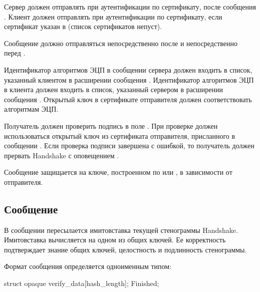 Сервер должен отправлять  при аутентификации по 
сертификату, после сообщения .
%
Клиент должен отправлять  при аутентификации по 
сертификату, если сертификат указан в  (список 
сертификатов непуст).

Сообщение  должно отправляться непосредственно после 
 и непосредственно перед .

Идентификатор алгоритмов ЭЦП в сообщении  сервера 
должен входить в список, указанный клиентом в расширении 
 сообщения . 
%
%
Идентификатор алгоритмов ЭЦП в  клиента 
должен входить в список, указанный сервером в расширении 
 сообщения 
.  
%
Открытый ключ в сертификате отправителя  должен 
соответствовать алгоритмам ЭЦП. 

Получатель  должен проверить подпись в поле
. При проверке должен использоваться открытый ключ из
сертификата отправителя, присланного в сообщении .
%
Если проверка подписи завершена с ошибкой, то получатель должен прервать 
Handshake с оповещением .

Сообщение  защищается на ключе, построенном по 
 или , 
в зависимости от отправителя.

\subsection{Сообщение }\label{HS.F} 

В сообщении  пересылается имитовставка текущей стенограммы 
Handshake. Имитовставка вычисляется на одном из общих ключей. Ее корректность 
подтверждает знание общих ключей, целостность и подлинность стенограммы.

Формат сообщения  определяется одноименным типом:

\begin{codeblock}
struct {
  opaque verify_data[hash_length];
} Finished;
\end{codeblock}


